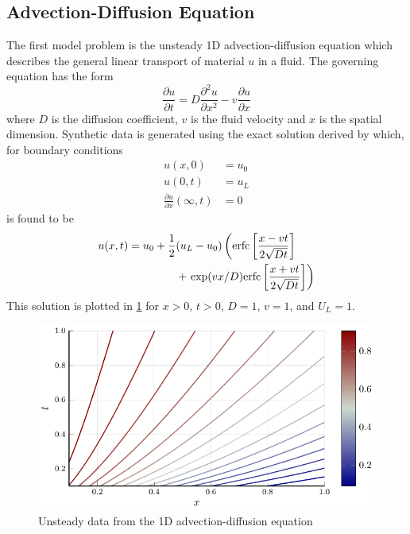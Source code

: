 \documentclass{article}
\begin{document}
\subsection{Advection-Diffusion Equation}

The first model problem is the unsteady 1D advection-diffusion equation which describes the general linear transport of material $u$ in a fluid. The governing equation has the form 
\begin{equation} 
\frac{\partial u}{\partial t} = D\frac{\partial^2 u}{\partial x^2} - v \frac{\partial u}{\partial x}
\end{equation}
where $D$ is the diffusion coefficient, $v$ is the fluid velocity and $x$ is the spatial dimension. Synthetic data is generated using the exact solution derived by \citet{van1982analytical} which, for boundary conditions 
\begin{align}
  u(x,0) &= u_0 \\
  u(0,t) &= u_L \\
  \frac{\partial u}{\partial x}(\infty, t) &= 0
\end{align}
is found to be 
\begin{equation}
  \begin{split}
  u(x,t) = u_0 + \frac{1}{2}&(u_L - u_0) \left({\rm erfc}\left[ \frac{x - vt}{2\sqrt{Dt}}\right]\right. \\
  &+ \left.{\rm exp}(vx/D) {\rm erfc}\left[ \frac{x + vt}{2\sqrt{Dt}}\right] \right)
  \end{split}
\end{equation}
This solution is plotted in \cref{fig:advdif} for $x>0$, $t>0$, $D=1$, $v=1$, and $U_L = 1$.

\begin{figure}
\vskip 0.2in
\begin{center}
\centerline{\includegraphics[width=\columnwidth]{./figures/advdif}}
\caption{Unsteady data from the 1D advection-diffusion equation}
\label{fig:advdif}
\end{center}
\vskip -0.2in
\end{figure}
\end{document}
